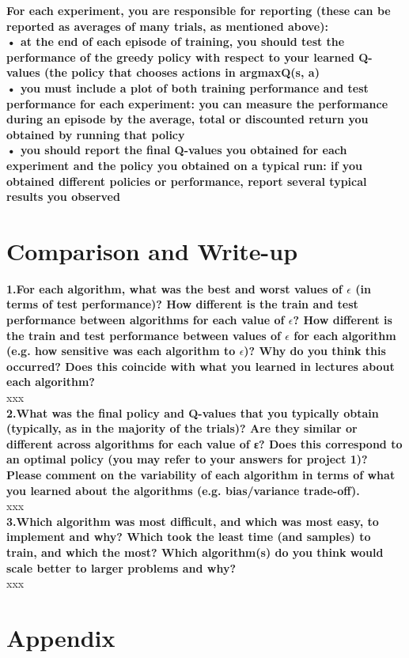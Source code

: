 \documentclass[11pt]{article}
\begin{document}
\noindent
\textbf{For each experiment, you are responsible for reporting (these can be
reported as averages of many trials, as mentioned above):} \\

\noindent
\textbf{• at the end of each episode of training, you should test the
performance of the greedy policy with respect to your learned Q-values (the
policy that chooses actions in argmaxQ(s, a)} \\

\noindent
\textbf{• you must include a plot of both training performance and test
performance for each experiment: you can measure the performance during an
episode by the average, total or discounted return you obtained by running that
policy} \\

\noindent
\textbf{• you should report the final Q-values you obtained for each experiment
and the policy you obtained on a typical run: if you obtained different policies
or performance, report several typical results you observed}


\newpage
\section{Comparison and Write-up}
\textbf{1.For each algorithm, what was the best and worst values of $\epsilon$
(in terms of test performance)? How different is the train and test performance
between algorithms for each value of $\epsilon$? How different is the train and
test performance between values of $\epsilon$ for each algorithm (e.g. how
sensitive was each algorithm to $\epsilon$)? Why do you think this occurred?
Does this coincide with what you learned in lectures about each algorithm?} \\
\noindent
xxx
\\
\textbf{2.What was the final policy and Q-values that you typically obtain (typically, as in the
majority of the trials)? Are they similar or different across algorithms for each value
of ε? Does this correspond to an optimal policy (you may refer to your answers for
project 1)? Please comment on the variability of each algorithm in terms of what
you learned about the algorithms (e.g. bias/variance trade-off).}
\\
\noindent
xxx
\\
\textbf{3.Which algorithm was most difficult, and which was most easy, to
implement and why? Which took the least time (and samples) to train, and which
the most? Which algorithm(s) do you think would scale better to larger problems
and why?} \\
\noindent
xxx
\\

\newpage
\section{Appendix}

\end{document}
